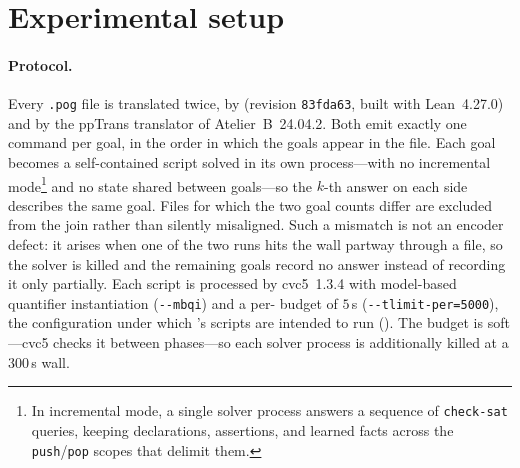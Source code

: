 \section{Experimental setup}
\label{sec:experimental-setup}

\paragraph*{Protocol.}
Every \texttt{.pog} file is translated twice, by \beer{} (revision \texttt{83fda63}, built with Lean~4.27.0) and by the ppTrans translator of Atelier~B~24.04.2.
Both emit exactly one  command per goal, in the order in which the goals appear in the file.
Each goal becomes a self-contained script solved in its own process---with no incremental mode\footnote{In incremental mode, a single solver process answers a sequence of \texttt{check-sat} queries, keeping declarations, assertions, and learned facts across the \texttt{push}/\texttt{pop} scopes that delimit them.} and no state shared between goals---so the \(k\)-th answer on each side describes the same goal.
Files for which the two goal counts differ are excluded from the join rather than silently misaligned.
Such a mismatch is not an encoder defect: it arises when one of the two runs hits the wall partway through a file, so the solver is killed and the remaining goals record no answer instead of recording it only partially.
Each script is processed by cvc5~1.3.4 with model-based quantifier instantiation (\texttt{-{}-mbqi}) and a per- budget of \(5\)\,s (\texttt{-{}-tlimit-per=5000}), the configuration under which \beer{}'s scripts are intended to run ().
The budget is soft---cvc5 checks it between phases---so each solver process is additionally killed at a \(300\)\,s wall.

